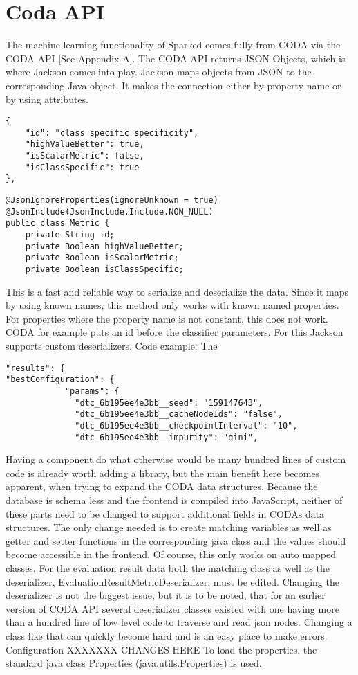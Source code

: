 \section{Coda API}
The machine learning functionality of Sparked comes fully from CODA via the CODA API [See Appendix A]. The CODA API returns JSON Objects, which is where Jackson comes into play. Jackson maps objects from JSON to the corresponding Java object. It makes the connection either by property name or by using attributes.\\
\begin{lstlisting}
{
	"id": "class specific specificity",
	"highValueBetter": true,
	"isScalarMetric": false,
	"isClassSpecific": true
},
\end{lstlisting}

\begin{lstlisting}
@JsonIgnoreProperties(ignoreUnknown = true)
@JsonInclude(JsonInclude.Include.NON_NULL)
public class Metric {
    private String id;
    private Boolean highValueBetter;
    private Boolean isScalarMetric;
    private Boolean isClassSpecific;
\end{lstlisting}

This is a fast and reliable way to serialize and deserialize the data. Since it maps by using known names, this method only works with known named properties. For properties where the property name is not constant, this does not work. CODA for example puts an id before the classifier parameters. For this Jackson supports custom deserializers. 
Code example: The 
\begin{lstlisting}
"results": {
"bestConfiguration": {
     		"params": {
              "dtc_6b195ee4e3bb__seed": "159147643",
              "dtc_6b195ee4e3bb__cacheNodeIds": "false",
              "dtc_6b195ee4e3bb__checkpointInterval": "10",
              "dtc_6b195ee4e3bb__impurity": "gini",
\end{lstlisting}

Having a component do what otherwise would be many hundred lines of custom code is already worth adding a library, but the main benefit here becomes apparent, when trying to expand the CODA data structures. Because the database is schema less and the frontend is compiled into JavaScript, neither of these parts need to be changed to support additional fields in CODAs data structures. The only change needed is to create matching variables as well as getter and setter functions in the corresponding java class and the values should become accessible in the frontend.
Of course, this only works on auto mapped classes. For the evaluation result data both the matching class as well as the deserializer, EvaluationResultMetricDeserializer, must be edited. Changing the  deserializer is not the biggest issue, but it is to be noted, that for an earlier version of CODA API several deserializer classes existed with one having more than a hundred line of low level code to traverse and read json nodes. Changing a class like that can quickly become hard and is an easy place to make errors. 
Configuration
XXXXXXX CHANGES HERE
To load the properties, the standard java class Properties (java.utils.Properties) is used. 

